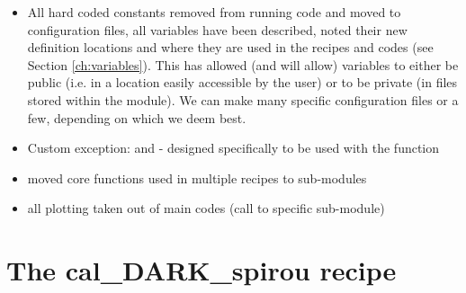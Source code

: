 \begin{itemize}
\item All hard coded constants removed from running code and moved to configuration files, all variables have been described, noted their new definition locations and where they are used in the recipes and codes (see Section \ref{ch:variables}). This has allowed (and will allow) variables to either be public (i.e. in a location easily accessible by the user) or to be private (in files stored within the module). We can make many specific configuration files or a few, depending on which we deem best.

\item Custom exception: \ConfigError and  - designed specifically to be used with the \WLOG function 

\item moved core functions used in multiple recipes to sub-modules

\item all plotting taken out of main codes (call to specific sub-module)

\end{itemize}

\section{The cal\_DARK\_spirou recipe}
\label{ch:changelog:At4:cal_DARK_spirou}

